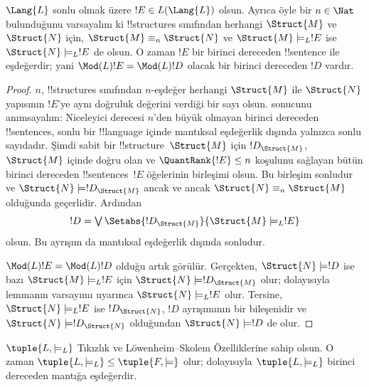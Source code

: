 



\begin{lem}
$\Lang{L}$ sonlu olmak üzere $!E\in L(\Lang{L})$ olsun. Ayrıca öyle bir
$n\in\Nat$ bulunduğunu varsayalım ki !!{structure}s sınıfından herhangi
$\Struct{M}$ ve $\Struct{N}$ için, $\Struct{M}\equiv_n\Struct{N}$ ve
$\Struct{M}\models_L !E$ ise $\Struct{N}\models_L !E$ de olsun. O zaman
$!E$ bir birinci dereceden !!{sentence} ile eşdeğerdir; yani
$\Mod(L){!E}=\Mod(L){!D}$ olacak bir birinci dereceden $!D$ vardır.
\end{lem}

\begin{proof}
$n$, !!{structure}s sınıfından $n$-eşdeğer herhangi $\Struct{M}$ ile
$\Struct{N}$ yapısının $!E$'ye aynı doğruluk değerini verdiği bir sayı olsun.
 sonucunu anımsayalım: Niceleyici derecesi
$n$'den büyük olmayan birinci dereceden !!{sentence}s, sonlu bir
!!{language} içinde mantıksal eşdeğerlik dışında yalnızca sonlu
sayıdadır. Şimdi sabit bir !!{structure}~$\Struct{M}$ için
$!D_{\Struct{M}}$, $\Struct{M}$ içinde doğru olan ve
$\QuantRank{!E}\leq n$ koşulunu sağlayan bütün birinci dereceden
!!{sentence}s~$!E$ öğelerinin birleşimi olsun. Bu birleşim sonludur ve
$\Struct{N}\models !D_{\Struct{M}}$ ancak ve ancak
$\Struct{N}\equiv_n\Struct{M}$ olduğunda geçerlidir. Ardından
\[
  !D=\textstyle\bigvee
  \Setabs{!D_{\Struct{M}}}{\Struct{M}\models_L !E}
\]
olsun. Bu ayrışım da mantıksal eşdeğerlik dışında sonludur.

$\Mod(L){!E}=\Mod(L){!D}$ olduğu artık görülür. Gerçekten,
$\Struct{N}\models !D$ ise bazı $\Struct{M}\models_L !E$ için
$\Struct{N}\models !D_{\Struct{M}}$ olur; dolayısıyla lemmanın varsayımı
uyarınca $\Struct{N}\models_L !E$ olur. Tersine,
$\Struct{N}\models_L !E$ ise $!D_{\Struct{N}}$, $!D$ ayrışımının bir
bileşenidir ve $\Struct{N}\models !D_{\Struct{N}}$ olduğundan
$\Struct{N}\models !D$ de olur.
\end{proof}

\begin{thm}
  $\tuple{L,\models_L}$ Tıkızlık ve L\"owenheim--Skolem Özelliklerine
  sahip olsun. O zaman
  $\tuple{L,\models_L}\leq\tuple{F,\models}$ olur; dolayısıyla
  $\tuple{L,\models_L}$ birinci dereceden mantığa eşdeğerdir.
\end{thm}

